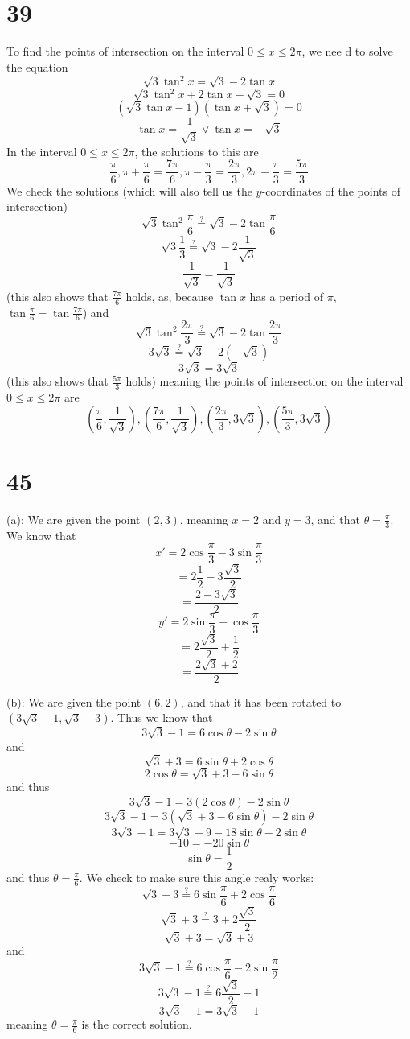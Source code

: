 \documentclass{article}
\theoremstyle{definition}
\newcommand{\?}{\stackrel{?}{=}}
\begin{document}
\section*{39}
To find the points of intersection on the interval $0\le x\le 2\pi$, we nee d to solve the equation
\[ \sqrt{3}\tan^2 x=\sqrt{3}-2\tan x \]
\[ \sqrt{3}\tan^2 x+2\tan x-\sqrt{3}=0 \]
\[ (\sqrt{3}\tan x-1)(\tan x+\sqrt{3})=0 \]
\[ \tan x=\frac{1}{\sqrt{3}}\vee\tan x=-\sqrt{3} \]
In the interval $0\le x\le 2\pi$, the solutions to this are
\[ \frac{\pi}{6},\pi+\frac{\pi}{6}=\frac{7\pi}{6},\pi-\frac{\pi}{3}=\frac{2\pi}{3},2\pi-\frac{\pi}{3}=\frac{5\pi}{3} \]
We check the solutions (which will also tell us the $y$-coordinates of the points of intersection)
\[ \sqrt{3}\tan^2\frac{\pi}{6}\?\sqrt{3}-2\tan\frac{\pi}{6} \]
\[ \sqrt{3}\frac{1}{3}\?\sqrt{3}-2\frac{1}{\sqrt{3}} \]
\[ \frac{1}{\sqrt{3}}=\frac{1}{\sqrt{3}} \] (this also shows that $\frac{7\pi}{6}$ holds, as, because $\tan x$ has a period of $\pi$,
$\tan\frac{\pi}{6}=\tan\frac{7\pi}{6}$) and
\[ \sqrt{3}\tan^2\frac{2\pi}{3}\?\sqrt{3}-2\tan\frac{2\pi}{3} \]
\[ 3\sqrt{3}\?\sqrt{3}-2(-\sqrt{3}) \]
\[ 3\sqrt{3}=3\sqrt{3} \] (this also shows that $\frac{5\pi}{3}$ holds) meaning the points of intersection on the interval $0\le x\le 2\pi$ are
\[ (\frac{\pi}{6},\frac{1}{\sqrt{3}}),(\frac{7\pi}{6},\frac{1}{\sqrt{3}}),(\frac{2\pi}{3},3\sqrt{3}),(\frac{5\pi}{3},3\sqrt{3}) \]

\section*{45}
(a): We are given the point $(2,3)$, meaning $x=2$ and $y=3$, and that $\theta=\frac{\pi}{3}$. We know that 
\[ x'=2\cos\frac{\pi}{3}-3\sin\frac{\pi}{3} \]
\[ =2\frac{1}{2}-3\frac{\sqrt{3}}{2} \]
\[ =\frac{2-3\sqrt{3}}{2} \]
\[ y'=2\sin\frac{\pi}{3}+\cos\frac{\pi}{3} \]
\[ =2\frac{\sqrt{3}}{2}+\frac{1}{2} \]
\[ =\frac{2\sqrt{3}+2}{2} \]


(b): We are given the point $(6,2)$, and that it has been rotated to $(3\sqrt{3}-1,\sqrt{3}+3)$. Thus we know that
\[ 3\sqrt{3}-1=6\cos\theta-2\sin\theta \]
and
\[ \sqrt{3}+3=6\sin\theta+2\cos\theta \]
\[ 2\cos\theta=\sqrt{3}+3-6\sin\theta \]
and thus
\[ 3\sqrt{3}-1=3(2\cos\theta)-2\sin\theta \]
\[ 3\sqrt{3}-1=3(\sqrt{3}+3-6\sin\theta)-2\sin\theta \]
\[ 3\sqrt{3}-1=3\sqrt{3}+9-18\sin\theta-2\sin\theta \]
\[ -10=-20\sin\theta \]
\[ \sin\theta=\frac{1}{2} \] and thus $\theta=\frac{\pi}{6}$.
We check to make sure this angle realy works:
\[ \sqrt{3}+3\? 6\sin\frac{\pi}{6}+2\cos\frac{\pi}{6} \]
\[ \sqrt{3}+3\? 3+2\frac{\sqrt{3}}{2} \]
\[ \sqrt{3}+3=\sqrt{3}+3 \]
and
\[ 3\sqrt{3}-1\? 6\cos\frac{\pi}{6}-2\sin\frac{\pi}{2} \]
\[ 3\sqrt{3}-1\? 6\frac{\sqrt{3}}{2}-1 \]
\[ 3\sqrt{3}-1=3\sqrt{3}-1 \]
meaning $\theta=\frac{\pi}{6}$ is the correct solution.
\end{document}
